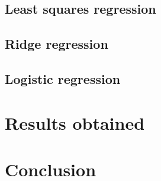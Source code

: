 \documentclass[10pt,conference,compsocconf]{IEEEtran}
\begin{document}
\subsection{Least squares regression}

\subsection{Ridge regression}

\subsection{Logistic regression}

\section{Results obtained}

\section{Conclusion}

% 
% 
\end{document}
